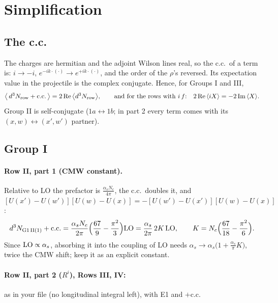 \documentclass[10pt]{article}
\numberwithin{equation}{section}
\newcommand{\LO}{{\rm LO}}
\begin{document}
\section{Simplification}\label{sec:simp}
\subsection{The c.c.}
The charges are hermitian and the adjoint Wilson lines real, so the c.c.\ of a term is: $i\to-i$, $e^{-ik\cdot(\cdot)}\to e^{+ik\cdot(\cdot)}$, and the order of the $\rho$'s reversed. Its expectation value in the projectile is the complex conjugate. Hence, for Groups I and III,
\begin{equation}
\big\langle\,d^3N_{\rm row}+{\rm c.c.}\,\big\rangle=2\,{\rm Re}\,\big\langle d^3N_{\rm row}\big\rangle,\qquad\text{and for the rows with }i\,f\text{:}\quad 2\,{\rm Re}\,\langle i X\rangle=-2\,{\rm Im}\,\langle X\rangle .
\end{equation}
Group II is self-conjugate ($1a\leftrightarrow1b$; in part 2 every term comes with its $(x,w)\leftrightarrow(x',w')$ partner).

\subsection{Group I}
\paragraph{Row II, part 1 (CMW constant).} Relative to LO the prefactor is $\frac{\alpha_sN_c}{4\pi}$, the c.c.\ doubles it, and $[U(x')-U(w')][U(w)-U(x)]=-[U(w')-U(x')][U(w)-U(x)]$:
\begin{equation}
d^3N_{\rm G1\,II(1)}+{\rm c.c.}=\frac{\alpha_sN_c}{2\pi}\Big(\frac{67}{9}-\frac{\pi^2}{3}\Big)\LO=\frac{\alpha_s}{2\pi}\,2K\,\LO,\qquad K=N_c\Big(\frac{67}{18}-\frac{\pi^2}{6}\Big).\label{eq:cmw}
\end{equation}
Since $\LO\propto\alpha_s$, absorbing it into the coupling of LO needs $\alpha_s\to\alpha_s\big(1+\frac{\alpha_s}{\pi}K\big)$, twice the CMW shift; keep it as an explicit constant.

\paragraph{Row II, part 2 ($R^i$), Rows III, IV:} as in your file (no longitudinal integral left), with E1 and $+$c.c.
\end{document}
